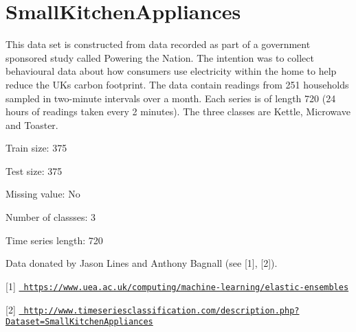 \chapter{Small\+Kitchen\+Appliances}
\hypertarget{md_external_2data_2UCRArchive__2018_2SmallKitchenAppliances_2README}{}\label{md_external_2data_2UCRArchive__2018_2SmallKitchenAppliances_2README}
\label{md_external_2data_2UCRArchive__2018_2SmallKitchenAppliances_2README_autotoc_md210}%
%
 This data set is constructed from data recorded as part of a government sponsored study called Powering the Nation. The intention was to collect behavioural data about how consumers use electricity within the home to help reduce the UK\textquotesingle{}s carbon footprint. The data contain readings from 251 households sampled in two-\/minute intervals over a month. Each series is of length 720 (24 hours of readings taken every 2 minutes). The three classes are Kettle, Microwave and Toaster.

Train size\+: 375

Test size\+: 375

Missing value\+: No

Number of classses\+: 3

Time series length\+: 720

Data donated by Jason Lines and Anthony Bagnall (see \mbox{[}1\mbox{]}, \mbox{[}2\mbox{]}).

\mbox{[}1\mbox{]} \href{https://www.uea.ac.uk/computing/machine-learning/elastic-ensembles}{\texttt{ https\+://www.\+uea.\+ac.\+uk/computing/machine-\/learning/elastic-\/ensembles}}

\mbox{[}2\mbox{]} \href{http://www.timeseriesclassification.com/description.php?Dataset=SmallKitchenAppliances}{\texttt{ http\+://www.\+timeseriesclassification.\+com/description.\+php?\+Dataset=\+Small\+Kitchen\+Appliances}} 